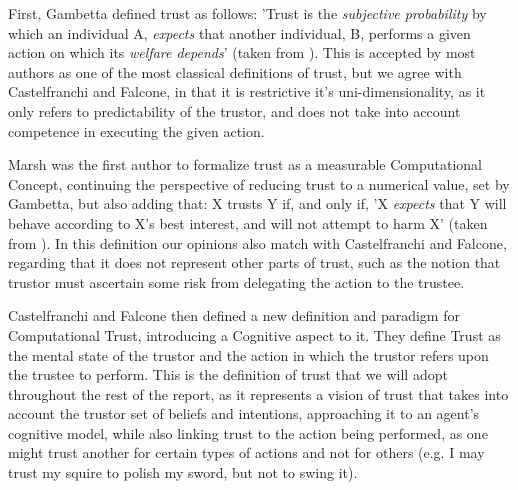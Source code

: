 \begin{itemize}
	\tallitem First, Gambetta\cite{Gambetta1988} defined trust as follows: 'Trust is the \textit{subjective probability} by which an individual A, \textit{expects} that another individual, B, performs a given action on which its \textit{welfare depends}' (taken from \cite{Castelfranchi2010}). This is accepted by most authors as one of the most classical definitions of trust, but we agree with Castelfranchi and Falcone, in that it is restrictive it's uni-dimensionality, as it only refers to predictability of the trustor, and does not take into account competence in executing the given action.
	
	\tallitem Marsh\cite{Marsh1994} was the first author to formalize trust as a measurable Computational Concept, continuing the perspective of reducing trust to a numerical value, set by Gambetta\cite{Gambetta1988}, but also adding that: X trusts Y if, and only if, 'X \textit{expects} that Y will behave according to X's best interest, and will not attempt to harm X' (taken from \cite{Castelfranchi2010}). In this definition our opinions also match with Castelfranchi and Falcone, regarding that it does not represent other parts of trust, such as the notion that trustor must ascertain some risk from delegating the action to the trustee.
	
	\tallitem Castelfranchi and Falcone then defined a new definition and paradigm for Computational Trust, introducing a Cognitive aspect to it\cite{Castelfranchi1998}. They define Trust as the mental state of the trustor and the action in which the trustor refers upon the trustee to perform. This is the definition of trust that we will adopt throughout the rest of the report, as it represents a vision of trust that takes into account the trustor set of beliefs and intentions, approaching it to an agent's cognitive model, while also linking trust to the action being performed, as one might trust another for certain types of actions and not for others (e.g. I may trust my squire to polish my sword, but not to swing it).
\end{itemize}

